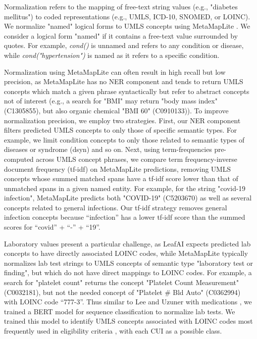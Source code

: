 \documentclass[../main.tex]{subfiles}
\begin{document}
Normalization refers to the mapping of free-text string values (e.g., "diabetes mellitus") to coded representations (e.g., UMLS, ICD-10, SNOMED, or LOINC). We normalize "named" logical forms to UMLS concepts using MetaMapLite \cite{aronson2001effective, demner2017metamap}. We consider a logical form "named" if it contains a free-text value surrounded by quotes. For example, \textit{cond()} is unnamed and refers to any condition or disease, while \textit{cond("hypertension")} is named as it refers to a specific condition. 

Normalization using MetaMapLite can often result in high recall but low precision, as MetaMapLite has no NER component and tends to return UMLS concepts which match a given phrase syntactically but refer to abstract concepts not of interest (e.g., a search for "BMI" may return "body mass index" (C1305855), but also organic chemical "BMI 60" (C0910133)). To improve normalization precision, we employ two strategies. First, our NER component filters predicted UMLS concepts to only those of specific semantic types. For example, we limit condition concepts to only those related to semantic types of diseases or syndrome (dsyn) and so on. Next, using term-frequencies pre-computed across UMLS concept phrases, we compare term frequency-inverse document frequency (tf-idf) on MetaMapLite predictions, removing UMLS concepts whose summed matched spans have a tf-idf score lower than that of unmatched spans in a given named entity. For example, for the string "covid-19 infection", MetaMapLite predicts both "COVID-19" (C5203670) as well as several concepts related to general infections. Our tf-idf strategy removes general infection concepts because “infection” has a lower tf-idf score than the summed scores for “covid” + “-” + “19”. 

Laboratory values present a particular challenge, as LeafAI expects predicted lab concepts to have directly associated LOINC codes, while MetaMapLite typically normalizes lab test strings to UMLS concepts of semantic type "laboratory test or finding", but which do not have direct mappings to LOINC codes. For example, a search for "platelet count" returns the concept "Platelet Count Measurement" (C0032181), but not the needed concept of "Platelet \# Bld Auto" (C0362994) with LOINC code “777-3”. Thus similar to Lee and Uzuner with medications \cite{lee2020normalizing}, we trained a BERT model for sequence classification to normalize lab tests. We trained this model to identify UMLS concepts associated with LOINC codes most frequently used in eligibility criteria \cite{rafee2022elapro}, with each CUI as a possible class.
\end{document}
